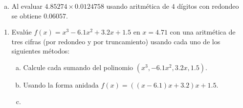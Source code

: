 \begin{frame}
\begin{enumerate}
\begin{enumerate}[a)]
                  \item

                        Al evaluar $4.85274\times 0.0124758$ usando
                        aritmética de $4$ dígitos con redondeo se
                        obtiene $0.06057$.
              \end{enumerate}

              \saveenum
    \end{enumerate}
\end{frame}


\begin{frame}
    \begin{enumerate}
        \resume

        \item

              Evalúe
              \begin{math}
                  f\left(x\right)=
                  x^{3}-
                  6.1x^{2}+
                  3.2x+
                  1.5
              \end{math}
              en $x=4.71$ con una aritmética de tres cifras (por
              redondeo y por truncamiento) usando cada uno de los
              siguientes métodos:

              \begin{enumerate}[a)]
                  \item

                        Calcule cada sumando del polinomio
                        \begin{math}
                            \left(
                            x^{3},
                            -6.1x^{2},
                            3.2x,
                            1.5
                            \right)
                        \end{math}.

                  \item

                        Usando la forma anidada
                        \begin{math}
                            f\left(x\right)=
                            \left(
                            \left(x-6.1\right)x+
                            3.2
                            \right)x
                            +1.5
                        \end{math}.

                  \item


\end{enumerate}
\end{enumerate}
\end{frame}
